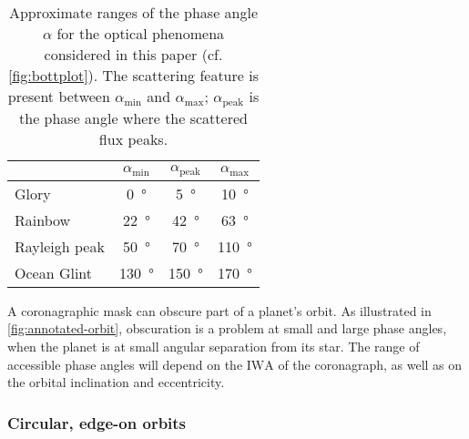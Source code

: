 \documentclass[usenatbib]{mnras}
\newcommand{\IWA}{\ensuremath{\mathrm{IWA}}\xspace}
\begin{document}
\begin{table}
    \centering
    \caption{
        Approximate ranges of the phase angle $\alpha$ for the optical phenomena considered in this paper (cf. \cref{fig:bottplot}). 
        The scattering feature is present between $\alpha_\mathrm{min}$ and $\alpha_\mathrm{max}$; $\alpha_\mathrm{peak}$ is the phase angle where the scattered flux peaks.
    }
    \label{tab:phase_ranges}
    \begin{tabular}{ l c c c } 
        \toprule
        & $\alpha_\mathrm{min}$ & $\alpha_\mathrm{peak}$ & $\alpha_\mathrm{max}$ \\
        \midrule
        Glory       & \qty{0}{\degree}     & \qty{5}{\degree}     & \qty{10}{\degree} \\
        Rainbow    & \qty{22}{\degree}    & \qty{42}{\degree}    & \qty{63}{\degree} \\
        Rayleigh peak    & \qty{50}{\degree}    & \qty{70}{\degree}    & \qty{110}{\degree} \\
        Ocean Glint & \qty{130}{\degree}   & \qty{150}{\degree}   & \qty{170}{\degree} \\
        \bottomrule
    \end{tabular}
\end{table}

A coronagraphic mask can obscure part of a planet's orbit. 
As illustrated in \cref{fig:annotated-orbit}, obscuration is a problem at small and large phase angles, when the planet is at small angular separation from its star.
The range of accessible phase angles will depend on the \IWA of the coronagraph, as well as on the orbital inclination and eccentricity.

\subsubsection{Circular, edge-on orbits}
 
\end{document}
